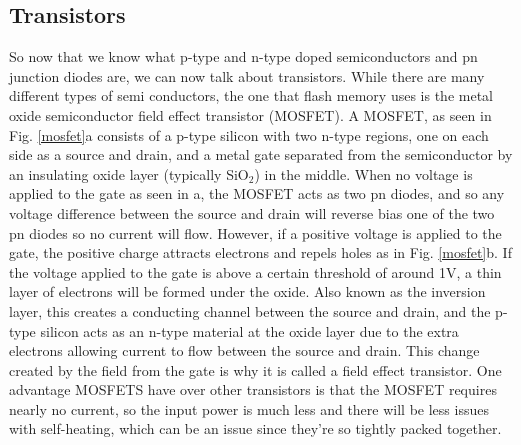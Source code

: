 \documentclass[ notitlepage, numerical, 11pt]{revtex4-1} %
\begin{document}
\subsection{Transistors}
So now that we know what p-type and n-type doped semiconductors and pn junction diodes are, we can now talk about transistors. While there are many different types of semi conductors, the one that flash memory uses is the metal oxide semiconductor field effect transistor (MOSFET). A MOSFET, as seen in Fig. \ref{mosfet}a consists of a p-type silicon with two n-type regions, one on each side as a source and drain, and a metal gate separated from the semiconductor by an insulating oxide layer (typically SiO$_2$) in the middle. When no voltage is applied to the gate as seen in a, the MOSFET acts as two pn diodes, and so any voltage difference between the source and drain will reverse bias one of the two pn diodes so no current will flow. However, if a positive voltage is applied to the gate, the positive charge attracts electrons and repels holes as in Fig. \ref{mosfet}b. If the voltage applied to the gate is above a certain threshold of around 1V, a thin layer of electrons will be formed under the oxide. Also known as the inversion layer, this creates a conducting channel between the source and drain, and the p-type silicon acts as an n-type material at the oxide layer due to the extra electrons allowing current to flow between the source and drain. This change created by the field from the gate is why it is called a field effect transistor. One advantage MOSFETS have over other transistors is that the MOSFET requires nearly no current, so the input power is much less and there will be less issues with self-heating, which can be an issue since they're so tightly packed together\cite{modernPhysics}.
\end{document}
